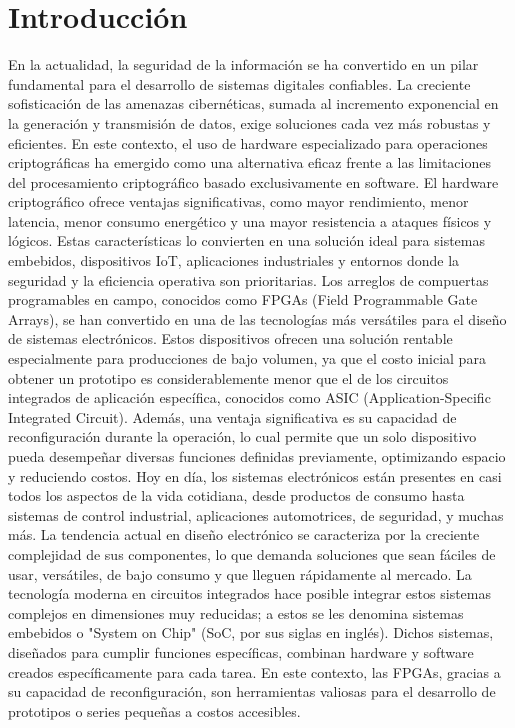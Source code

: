 
\chapter{Introducción} 
En la actualidad, la seguridad de la información se ha convertido en un pilar fundamental para el desarrollo de sistemas digitales confiables. La creciente sofisticación de las amenazas cibernéticas, sumada al incremento exponencial en la generación y transmisión de datos, exige soluciones cada vez más robustas y eficientes. En este contexto, el uso de hardware especializado para operaciones criptográficas ha emergido como una alternativa eficaz frente a las limitaciones del procesamiento criptográfico basado exclusivamente en software.
El hardware criptográfico ofrece ventajas significativas, como mayor rendimiento, menor latencia, menor consumo energético y una mayor resistencia a ataques físicos y lógicos. Estas características lo convierten en una solución ideal para sistemas embebidos, dispositivos IoT, aplicaciones industriales y entornos donde la seguridad y la eficiencia operativa son prioritarias.
Los arreglos de compuertas programables en campo, conocidos como FPGAs (Field Programmable Gate Arrays), se han convertido en una de las tecnologías más versátiles para el diseño de sistemas electrónicos. Estos dispositivos ofrecen una solución rentable especialmente para producciones de bajo volumen, ya que el costo inicial para obtener un prototipo es considerablemente menor que el de los circuitos integrados de aplicación específica, conocidos como ASIC (Application-Specific Integrated Circuit). Además, una ventaja significativa es su capacidad de reconfiguración durante la operación, lo cual permite que un solo dispositivo pueda desempeñar diversas funciones definidas previamente, optimizando espacio y reduciendo costos.
Hoy en día, los sistemas electrónicos están presentes en casi todos los aspectos de la vida cotidiana, desde productos de consumo hasta sistemas de control industrial, aplicaciones automotrices, de seguridad, y muchas más. La tendencia actual en diseño electrónico se caracteriza por la creciente complejidad de sus componentes, lo que demanda soluciones que sean fáciles de usar, versátiles, de bajo consumo y que lleguen rápidamente al mercado. La tecnología moderna en circuitos integrados hace posible integrar estos sistemas complejos en dimensiones muy reducidas; a estos se les denomina sistemas embebidos o "System on Chip" (SoC, por sus siglas en inglés). Dichos sistemas, diseñados para cumplir funciones específicas, combinan hardware y software creados específicamente para cada tarea. En este contexto, las FPGAs, gracias a su capacidad de reconfiguración, son herramientas valiosas para el desarrollo de prototipos o series pequeñas a costos accesibles.
